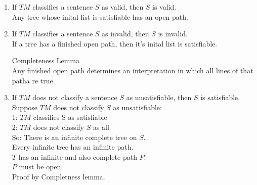 \begin{enumerate}
\item If $TM$ classifies a sentence $S$ as valid, then $S$ is valid. \\
Any tree whose inital list is satisfiable has an open path.
\item If $TM$ classifies a sentence $S$ as invalid, then $S$ is invalid. \\
If a tree has a finished open path, then it's inital list is satisfiable.
\begin{lemma}Completeness Lemma\\
Any finished open path determines an interpretation in which all lines of that patha re true.
\end{lemma}
\item If $TM$ does not classify a sentence $S$ as unsatisfiable, then $S$ is satisfiable. \\
Suppose $TM$ does not classify $S$ as unsatisfiable:\\
1: $TM$ classifies S as satisfiable \\
2: $TM$ does not classify $S$ as all\\
So: There is an infinite complete tree on $S$. \\
Every infinite tree has an infinite path. \\
$T$ has an infinite and also complete path $P$. \\
$P$ must be open. \\
Proof by Completness lemma. \\
\end{enumerate}

